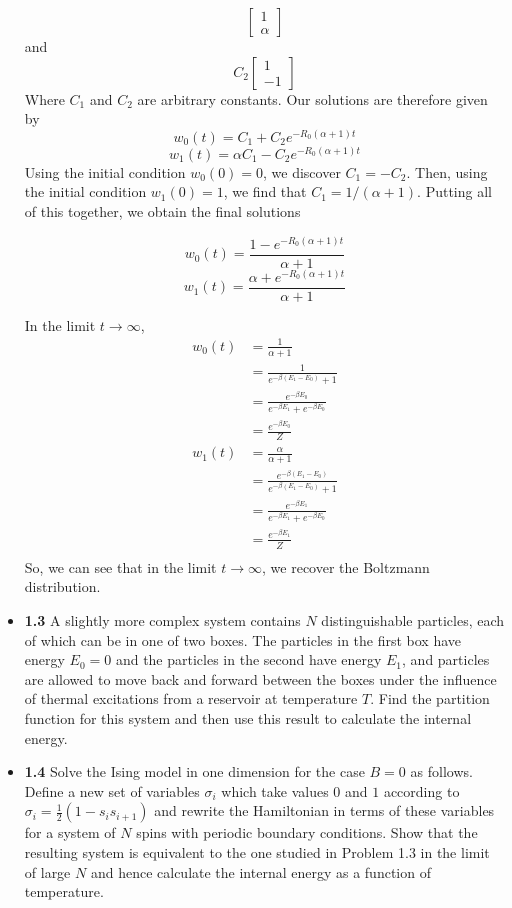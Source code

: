 \documentclass{article}
\begin{document}
\begin{itemize}
{$$\begin{bmatrix}
1\\
\alpha
\end{bmatrix}$$
and
$$C_{2}\begin{bmatrix}
1\\
-1
\end{bmatrix}$$
Where $C_{1}$ and $C_{2}$ are arbitrary constants. Our solutions are therefore given by
$$w_{0}(t) = C_{1} + C_{2}e^{-R_{0}(\alpha + 1)t} $$
$$w_{1}(t) = \alpha C_{1} - C_{2}e^{-R_{0}(\alpha + 1)t}$$
Using the initial condition $w_{0}(0) = 0$, we discover $C_{1} = -C_{2}$. Then, using the initial condition $w_{1}(0) = 1$, we find
that $C_{1} = 1/(\alpha + 1)$. Putting all of this together, we obtain the final solutions

$$w_{0}(t) = \frac{1 - e^{-R_{0}(\alpha + 1)t}}{\alpha + 1}$$
$$w_{1}(t) = \frac{\alpha + e^{-R_{0}(\alpha + 1)t}}{\alpha + 1}$$

In the limit $t \rightarrow \infty$,
$$
\begin{aligned}
w_{0}(t) &= \frac{1}{\alpha + 1} \\
&= \frac{1}{e^{-\beta (E_{1} - E_{0})} + 1} \\
&= \frac{e^{-\beta E_{0}}}{e^{-\beta E_{1}} + e^{-\beta E_{0}}} \\
&= \frac{e^{-\beta E_{0}}}{Z}
\end{aligned}
$$
$$
\begin{aligned}
w_{1}(t) &= \frac{\alpha}{\alpha + 1} \\
&= \frac{e^{-\beta (E_{1} - E_{0})} }{e^{-\beta (E_{1} - E_{0})}  + 1} \\
&= \frac{e^{-\beta E_{1}}}{e^{-\beta E_{1}}  + e^{-\beta E_{0}}} \\
&= \frac{e^{-\beta E_{1}}}{Z} \\
\end{aligned}
$$
So, we can see that in the limit $t \rightarrow \infty$, we recover the Boltzmann distribution.
}
\item \textbf{1.3} A slightly more complex system contains $N$ distinguishable particles, each of which can be in one of two
boxes. The particles in the first box have energy $E_{0} = 0$ and the particles in the second have energy $E_{1}$, and
particles are allowed to move back and forward between the boxes under the influence of thermal excitations from a
reservoir at temperature $T$. Find the partition function for this system and then use this result to calculate the internal
energy.
\item \textbf{1.4} Solve the Ising model in one dimension for the case $B = 0$ as follows. Define a new set
of variables $\sigma_{i}$ which take values $0$ and $1$ according to
$\sigma_{i} = \frac{1}{2}(1 - s_{i}s_{i+1})$ and rewrite the Hamiltonian in terms of these
variables for a system of $N$ spins with periodic boundary conditions. Show that the resulting system is
equivalent to the one studied in Problem 1.3 in the limit of large $N$ and hence calculate the internal
energy as a function of temperature.
\end{itemize}
\end{document}
